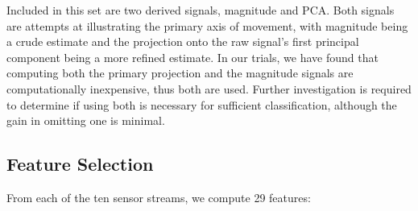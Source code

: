 Included in this set are two derived signals, magnitude and PCA. Both signals are attempts at illustrating the primary axis of movement, with magnitude being a crude estimate and the projection onto the raw signal's first principal component being a more refined estimate. In our trials, we have found that computing both the primary projection and the magnitude signals are computationally inexpensive, thus both are used. Further investigation is required to determine if using both is necessary for sufficient classification, although the gain in omitting one is minimal.

\subsection{Feature Selection} 
From each of the ten sensor streams, we compute 29 features: 

